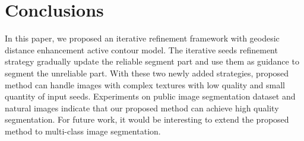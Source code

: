 \documentclass{article}
\begin{document}
\section{Conclusions}
\label{sec:Conc}
%
In this paper, we proposed an iterative refinement framework with geodesic distance enhancement active contour model. The iterative seeds refinement strategy gradually update the reliable segment part and use them as guidance to segment the unreliable part. With these two newly added strategies, proposed method can handle images with complex textures with low quality and small quantity of input seeds. Experiments on public image segmentation dataset and natural images indicate that our proposed method can achieve high quality segmentation. For future work, it would be interesting to extend the proposed method to multi-class image segmentation.
%


%
\end{document}
